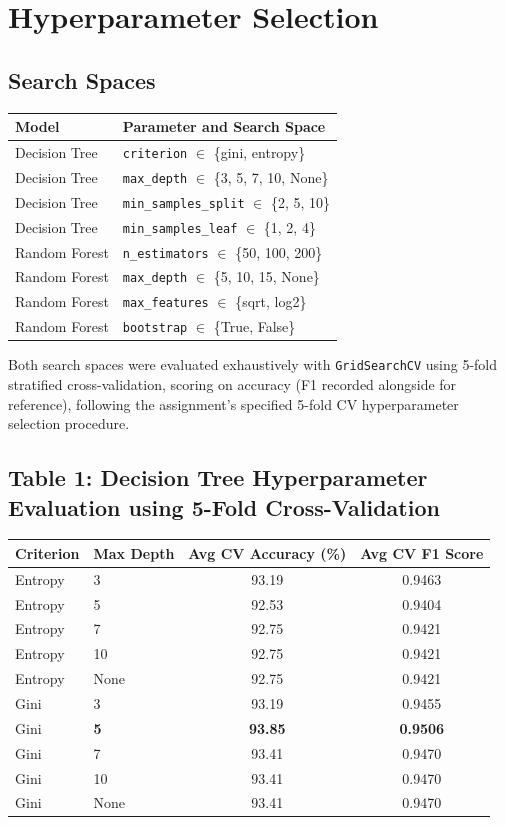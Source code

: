 \documentclass[12pt,a4paper]{article}
\begin{document}
\section{Hyperparameter Selection}

\subsection*{Search Spaces}
\begin{tabular}{ll}
\toprule
Model & Parameter and Search Space \\
\midrule
Decision Tree & \texttt{criterion} $\in$ \{gini, entropy\} \\
Decision Tree & \texttt{max\_depth} $\in$ \{3, 5, 7, 10, None\} \\
Decision Tree & \texttt{min\_samples\_split} $\in$ \{2, 5, 10\} \\
Decision Tree & \texttt{min\_samples\_leaf} $\in$ \{1, 2, 4\} \\
\midrule
Random Forest & \texttt{n\_estimators} $\in$ \{50, 100, 200\} \\
Random Forest & \texttt{max\_depth} $\in$ \{5, 10, 15, None\} \\
Random Forest & \texttt{max\_features} $\in$ \{sqrt, log2\} \\
Random Forest & \texttt{bootstrap} $\in$ \{True, False\} \\
\bottomrule
\end{tabular}
\vspace{2mm}

Both search spaces were evaluated exhaustively with \texttt{GridSearchCV} using 5-fold
stratified cross-validation, scoring on accuracy (F1 recorded alongside for reference),
following the assignment's specified 5-fold CV hyperparameter selection procedure.

\subsection*{Table 1: Decision Tree Hyperparameter Evaluation using 5-Fold
Cross-Validation}
\begin{tabular}{llcc}
\toprule
Criterion & Max Depth & Avg CV Accuracy (\%) & Avg CV F1 Score \\
\midrule
Entropy & 3 & 93.19 & 0.9463 \\
Entropy & 5 & 92.53 & 0.9404 \\
Entropy & 7 & 92.75 & 0.9421 \\
Entropy & 10 & 92.75 & 0.9421 \\
Entropy & None & 92.75 & 0.9421 \\
Gini & 3 & 93.19 & 0.9455 \\
Gini & \textbf{5} & \textbf{93.85} & \textbf{0.9506} \\
Gini & 7 & 93.41 & 0.9470 \\
Gini & 10 & 93.41 & 0.9470 \\
Gini & None & 93.41 & 0.9470 \\
\bottomrule
\end{tabular}
\vspace{2mm}
\end{document}

